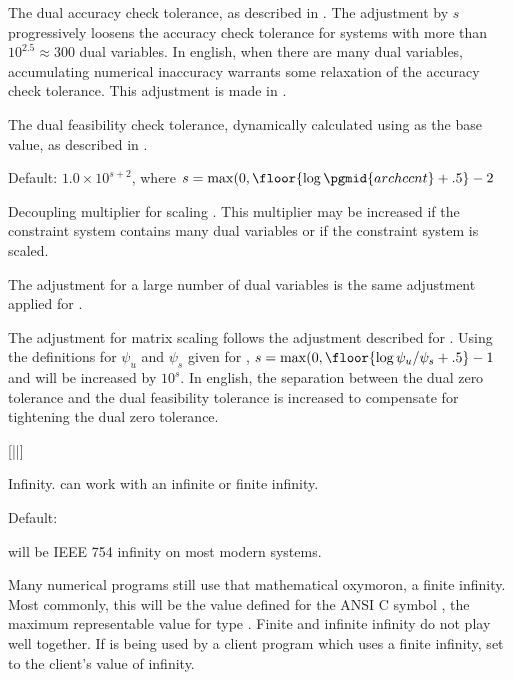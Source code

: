 \begin{codedoc}
  The dual accuracy check tolerance, as described in .
  The adjustment by $s$ progressively loosens the accuracy check tolerance
  for systems with more than $10^{2.5} \approx 300$ dual variables.
  In english, when there are many dual variables, accumulating numerical
  inaccuracy warrants some relaxation of the accuracy check tolerance.
  This adjustment is made in .

  \item{}

  The dual feasibility check tolerance, dynamically calculated using
   as the base value, as described in .

  \item{}
    \kw{;}

  Default: $1.0 \times 10^{s+2}$, 
      where $s = \max (0, \floor{\log \pgmid{archccnt} + .5}-2$

  Decoupling multiplier for scaling .
  This multiplier may be increased if the constraint system contains many
  dual variables or if the constraint system is scaled.

  The adjustment for a large number of dual variables is the same
  adjustment applied for .

  The adjustment for matrix scaling follows the adjustment described for
  .
  Using the definitions for $\psi_u$ and $\psi_s$ given for ,
  $s = \max (0, \floor{\log \psi_u/\psi_s + .5}-1$
  and  will be increased by $10^s$.
  In english, the separation between the dual zero tolerance and the dual
  feasibility tolerance is increased to compensate for tightening the
  dual zero tolerance.

  \item{}
   [||] \kw{;}

  Infinity.
  \dylp can work with an infinite or finite infinity.

  Default: 
  
   will be IEEE 754 infinity on most modern systems.

  Many numerical programs still use that mathematical oxymoron, a finite
  infinity.
  Most commonly, this will be the value defined for the ANSI C symbol
  , the maximum representable value for type
  .
  Finite and infinite infinity do not play well together.
  If \dylp is being used by a client program which uses a finite infinity,
  set  to the client's value of infinity.


\end{codedoc}
